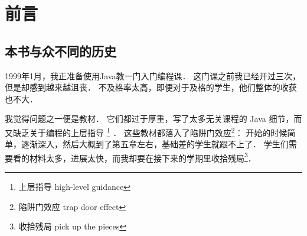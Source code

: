 

\chapter{前言}

\section*{本书与众不同的历史}


1999年1月，我正准备使用Java教一门入门编程课．
这门课之前我已经开过三次， 但是却感到越来越沮丧． 不及格率太高，即便对于及格的学生，他们整体的收获也不大．


我觉得问题之一便是教材．
它们都过于厚重，写了太多无关课程的 Java 细节，而又缺乏关于编程的上层指导 \footnote{上层指导 high-level guidance} ．
这些教材都落入了陷阱门效应\footnote {陷阱门效应 trap door effect}： 开始的时候简单，逐渐深入，然后大概到了第五章左右，基础差的学生就跟不上了．
学生们需要看的材料太多，进展太快，而我却要在接下来的学期里收拾残局\footnote{收拾残局 pick up the pieces}．




